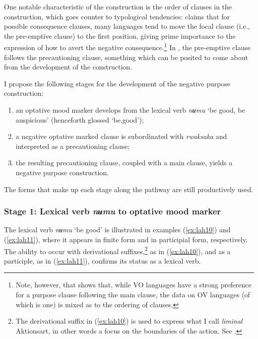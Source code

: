 \documentclass[output=paper,colorlinks,citecolor=brown]{langscibook}
\begin{document}
One notable characteristic of the construction is the order of clauses in the construction, which goes counter to typological tendencies: \citet[39, 48]{dixon2009} claims that for possible consequence clauses, many languages tend to move the focal clause (i.e., the pre{}-emptive clause) to the first position, giving prime importance to the expression of how to avert the negative consequence.\footnote{Note, however, that \citet[113ff]{Schmidtke-Bode2009} shows that, while VO languages have a strong preference for a purpose clause following the main clause, the data on OV languages (of which  is one) is mixed as to the ordering of clauses.} In , the pre-emptive clause follows the precautioning clause, something which can be posited to come about from the development of the construction.

I propose the following stages for the development of the negative purpose construction:

\begin{enumerate}
    \item an optative mood marker develops from the lexical verb \textit{nʉmu} `be good, be auspicious' (henceforth glossed `be.good');
    \item a negative optative marked clause is subordinated with \textit{rwaksaka} and interpreted as a precautioning clause;
    \item the resulting precautioning clause, coupled with a main clause, yields a negative purpose construction.
\end{enumerate}

\noindent The forms that make up each stage along the pathway are still productively used. 

\subsubsection{Stage 1: Lexical verb \emph{nʉmu} to optative mood marker}
\label{subsubsec:stage1}

The lexical verb \textit{nʉmu} `be good' is illustrated in examples (\ref{ex:lah10}) and (\ref{ex:lah11}), where it appears in finite form and in participial form, respectively. The ability to occur with derivational suffixes,\footnote{The derivational suffix in (\ref{ex:lah10}) is used to express what I call \textit{liminal} Aktionsart, in other words a focus on the boundaries of the action. See \citet{Lahaussois2020b,Lahaussois2020a}.} as in (\ref{ex:lah10}), and as a participle, as in (\ref{ex:lah11}), confirms its status as a lexical verb.
\end{document}
